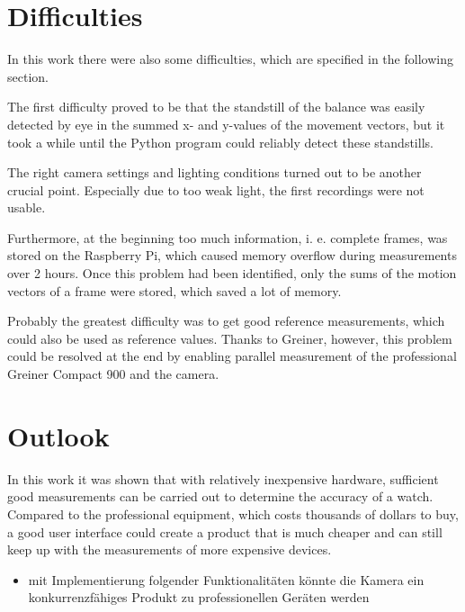 \documentclass[12pt, a4paper]{report}
\begin{document}
    \section{Difficulties}
In this work there were also some difficulties, which are specified in the following section.

The first difficulty proved to be that the standstill of the balance was easily detected by eye in the summed x- and y-values of the movement vectors, but it took a while until the Python program could reliably detect these standstills.

The right camera settings and lighting conditions turned out to be another crucial point. Especially due to too weak light, the first recordings were not usable. 

Furthermore, at the beginning too much information, i. e. complete frames, was stored on the Raspberry Pi, which caused memory overflow during measurements over 2 hours. Once this problem had been identified, only the sums of the motion vectors of a frame were stored, which saved a lot of memory.

Probably the greatest difficulty was to get good reference measurements, which could also be used as reference values. Thanks to Greiner, however, this problem could be resolved at the end by enabling parallel measurement of the professional Greiner Compact 900 and the camera.

    \section{Outlook}
    In this work it was shown that with relatively inexpensive hardware, sufficient good measurements can be carried out to determine the accuracy of a watch. Compared to the professional equipment, which costs thousands of dollars to buy, a good user interface could create a product that is much cheaper and can still keep up with the measurements of more expensive devices. 
    
             \begin{itemize}
    \item mit Implementierung folgender Funktionalitäten könnte die Kamera ein konkurrenzfähiges Produkt zu professionellen Geräten werden
    \end{itemize}
    
    \glsaddall
    \printglossaries

\printbibliography
        
\end{document}
